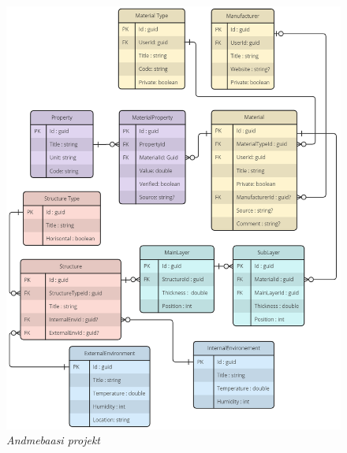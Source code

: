 \begin{figure}[ht]
    \centering
    \includegraphics[width=.9\textwidth]{figures/analysis/db_full.png}
    \caption[Andmebaasi projekt]{\textit{Andmebaasi projekt}}
    \label{fig:db_full}
\end{figure}



